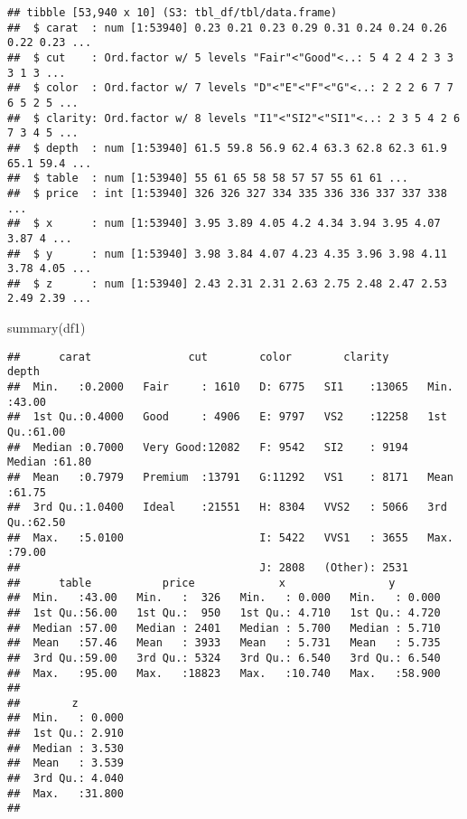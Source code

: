 \documentclass[
]{article}
\newenvironment{Shaded}{\begin{snugshade}}{\end{snugshade}}
\newcommand{\FunctionTok}[1]{\textcolor[rgb]{0.00,0.00,0.00}{#1}}
\newcommand{\NormalTok}[1]{#1}
\begin{document}
\begin{verbatim}
## tibble [53,940 x 10] (S3: tbl_df/tbl/data.frame)
##  $ carat  : num [1:53940] 0.23 0.21 0.23 0.29 0.31 0.24 0.24 0.26 0.22 0.23 ...
##  $ cut    : Ord.factor w/ 5 levels "Fair"<"Good"<..: 5 4 2 4 2 3 3 3 1 3 ...
##  $ color  : Ord.factor w/ 7 levels "D"<"E"<"F"<"G"<..: 2 2 2 6 7 7 6 5 2 5 ...
##  $ clarity: Ord.factor w/ 8 levels "I1"<"SI2"<"SI1"<..: 2 3 5 4 2 6 7 3 4 5 ...
##  $ depth  : num [1:53940] 61.5 59.8 56.9 62.4 63.3 62.8 62.3 61.9 65.1 59.4 ...
##  $ table  : num [1:53940] 55 61 65 58 58 57 57 55 61 61 ...
##  $ price  : int [1:53940] 326 326 327 334 335 336 336 337 337 338 ...
##  $ x      : num [1:53940] 3.95 3.89 4.05 4.2 4.34 3.94 3.95 4.07 3.87 4 ...
##  $ y      : num [1:53940] 3.98 3.84 4.07 4.23 4.35 3.96 3.98 4.11 3.78 4.05 ...
##  $ z      : num [1:53940] 2.43 2.31 2.31 2.63 2.75 2.48 2.47 2.53 2.49 2.39 ...
\end{verbatim}

\begin{Shaded}
\begin{Highlighting}[]
\FunctionTok{summary}\NormalTok{(df1)}
\end{Highlighting}
\end{Shaded}

\begin{verbatim}
##      carat               cut        color        clarity          depth      
##  Min.   :0.2000   Fair     : 1610   D: 6775   SI1    :13065   Min.   :43.00  
##  1st Qu.:0.4000   Good     : 4906   E: 9797   VS2    :12258   1st Qu.:61.00  
##  Median :0.7000   Very Good:12082   F: 9542   SI2    : 9194   Median :61.80  
##  Mean   :0.7979   Premium  :13791   G:11292   VS1    : 8171   Mean   :61.75  
##  3rd Qu.:1.0400   Ideal    :21551   H: 8304   VVS2   : 5066   3rd Qu.:62.50  
##  Max.   :5.0100                     I: 5422   VVS1   : 3655   Max.   :79.00  
##                                     J: 2808   (Other): 2531                  
##      table           price             x                y         
##  Min.   :43.00   Min.   :  326   Min.   : 0.000   Min.   : 0.000  
##  1st Qu.:56.00   1st Qu.:  950   1st Qu.: 4.710   1st Qu.: 4.720  
##  Median :57.00   Median : 2401   Median : 5.700   Median : 5.710  
##  Mean   :57.46   Mean   : 3933   Mean   : 5.731   Mean   : 5.735  
##  3rd Qu.:59.00   3rd Qu.: 5324   3rd Qu.: 6.540   3rd Qu.: 6.540  
##  Max.   :95.00   Max.   :18823   Max.   :10.740   Max.   :58.900  
##                                                                   
##        z         
##  Min.   : 0.000  
##  1st Qu.: 2.910  
##  Median : 3.530  
##  Mean   : 3.539  
##  3rd Qu.: 4.040  
##  Max.   :31.800  
## 
\end{verbatim}
\end{document}
